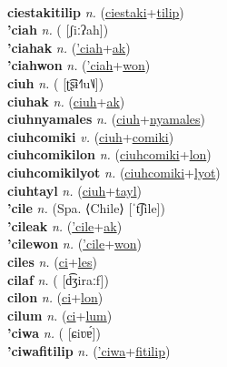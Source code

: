  \label{ciestakilum} \\
\textbf{ciestakitilip} \textit{n.} (\hyperref[ciestaki]{ciestaki}+\hyperref[tilip]{tilip})
 \label{ciestakitilip} \\
\textbf{'ciah} \textit{n.} ( [ʃiːʔah])
 \label{'ciah} \\
\textbf{'ciahak} \textit{n.} (\hyperref['ciah]{'ciah}+\hyperref[ak]{ak})
 \label{'ciahak} \\
\textbf{'ciahwon} \textit{n.} (\hyperref['ciah]{'ciah}+\hyperref[won]{won})
 \label{'ciahwon} \\
\textbf{ciuh} \textit{n.} ( [ʈ͡ʂɨ˧˥u˥˩])
 \label{ciuh} \\
\textbf{ciuhak} \textit{n.} (\hyperref[ciuh]{ciuh}+\hyperref[ak]{ak})
 \label{ciuhak} \\
\textbf{ciuhnyamales} \textit{n.} (\hyperref[ciuh]{ciuh}+\hyperref[nyamales]{nyamales})
 \label{ciuhnyamales} \\
\textbf{ciuhcomiki} \textit{v.} (\hyperref[ciuh]{ciuh}+\hyperref[comiki]{comiki})
 \label{ciuhcomiki} \\
\textbf{ciuhcomikilon} \textit{n.} (\hyperref[ciuhcomiki]{ciuhcomiki}+\hyperref[lon]{lon})
 \label{ciuhcomikilon} \\
\textbf{ciuhcomikilyot} \textit{n.} (\hyperref[ciuhcomiki]{ciuhcomiki}+\hyperref[lyot]{lyot})
 \label{ciuhcomikilyot} \\
\textbf{ciuhtayl} \textit{n.} (\hyperref[ciuh]{ciuh}+\hyperref[tayl]{tayl})
 \label{ciuhtayl} \\
\textbf{'cile} \textit{n.} (Spa. ⟨Chile⟩ [ˈt͡ʃile])
 \label{'cile} \\
\textbf{'cileak} \textit{n.} (\hyperref['cile]{'cile}+\hyperref[ak]{ak})
 \label{'cileak} \\
\textbf{'cilewon} \textit{n.} (\hyperref['cile]{'cile}+\hyperref[won]{won})
 \label{'cilewon} \\
\textbf{ciles} \textit{n.} (\hyperref[ci]{ci}+\hyperref[les]{les})
 \label{ciles} \\
\textbf{cilaf} \textit{n.} ( [d͡ʒiraːf])
 \label{cilaf} \\
\textbf{cilon} \textit{n.} (\hyperref[ci]{ci}+\hyperref[lon]{lon})
 \label{cilon} \\
\textbf{cilum} \textit{n.} (\hyperref[ci]{ci}+\hyperref[lum]{lum})
 \label{cilum} \\
\textbf{'ciwa} \textit{n.} ( [ɕiʋɐ́])
 \label{'ciwa} \\
\textbf{'ciwafitilip} \textit{n.} (\hyperref['ciwa]{'ciwa}+\hyperref[fitilip]{fitilip})
